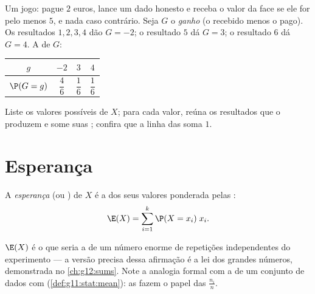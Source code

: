 \begin{example}\label{ex:g11:prob:game}
Um jogo: pague $2$ euros, lance um dado honesto e receba o valor da face
se ele for pelo menos $5$, e nada caso contrário. Seja $G$ o
\emph{ganho} (o recebido menos o pago). Os resultados $1, 2, 3, 4$ dão
$G = -2$; o resultado $5$ dá $G = 3$; o resultado $6$ dá $G = 4$. A
 de $G$:
\begin{center}
\begin{tabular}{c|ccc}
$g$ & $-2$ & $3$ & $4$\\
\hline\rule{0pt}{11pt}%
$\P(G = g)$ & $\dfrac46$ & $\dfrac16$ & $\dfrac16$
\end{tabular}
\end{center}
\end{example}

\begin{method}\label{met:g11:prob:table}
Liste os valores possíveis de $X$; para cada valor, reúna os resultados
que o produzem e some suas ; confira que a linha das
 soma $1$.
\end{method}

\section{Esperança}

\begin{definition}[Esperança]\label{def:g11:prob:expectation}
A \emph{esperança} (ou ) de $X$ é a  dos seus
valores ponderada pelas :
\[
\E(X) = \sum_{i=1}^{k} \P(X = x_i)\; x_i .
\]
\end{definition}

\begin{remark}
$\E(X)$ é o que seria a  de um número enorme de repetições
independentes do experimento --- a versão precisa dessa afirmação é a lei
dos grandes números, demonstrada no \cref{ch:g12:sums}. Note a analogia
formal com a  de um conjunto de dados com 
(\cref{def:g11:stat:mean}): as  fazem o papel das
 $\frac{n_i}{n}$.
\end{remark}

